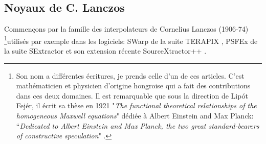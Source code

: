 \documentclass[11pt,twoside]{article}
\begin{document}
\subsection{Noyaux de C. Lanczos}
%
Commençons par la famille des interpolateurs de Cornelius Lanczos (1906-74) \footnote{Son nom a différentes écritures, je prends celle d'un de ces articles. C'est mathématicien et physicien d'origine hongroise qui a fait des contributions dans ces deux domaines. Il est remarquable que sous la direction de Lipót Fejér, il écrit sa thèse en 1921 "\textit{The functional theoretical relationships of the homogeneous Maxwell equations}" dédiée à Albert Einstein and Max Planck: “\textit{Dedicated to Albert Einstein and Max Planck, the two great standard-bearers of constructive speculation}" \citep{lanczos2004relations}.}utilisés par exemple dans les logiciels: \textsf{SWarp} de la suite \textsf{TERAPIX} \citep{2002ASPC..281..228B}, \textsf{PSFEx} de la suite \textsf{SExtractor} \citep{1996A&AS..117..393B, 2011ASPC..442..435B} et son extension récente \textsf{SourceXtractor++} \citep{2022arXiv221202428K}.
\end{document}
